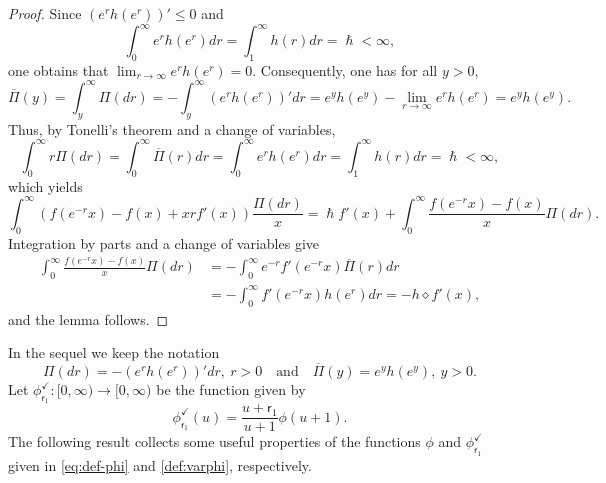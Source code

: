 \documentclass[10pt]{amsart}
\theoremstyle{plain}
\theoremstyle{definition}
\newcommand{\vat}{{\mathsf{r}_1}}
\renewcommand{\varphi}{{\phi_{\vat}^{\checkmark}}}
\let\h\hslash
\begin{document}
\begin{proof}
Since $(e^rh(e^r))' \le 0$ and
\begin{equation*}
\int_0^\infty e^rh(e^r)dr = \int_1^\infty h(r)dr = \h < \infty,
\end{equation*}
one obtains that $\lim_{r \to \infty} e^r h(e^r) = 0$. Consequently, one has for all $y>0$,
\begin{equation*}
\overline{\Pi}(y) = \int_y^\infty \Pi(dr) = -\int_y^\infty (e^rh(e^r))' dr = e^yh(e^y) - \lim_{r \to \infty} e^r h(e^r) = e^yh(e^y).
\end{equation*}
Thus, by Tonelli's theorem and a change of variables,
\begin{equation*}
\int_0^\infty r\Pi(dr) = \int_0^\infty \overline{\Pi}(r)dr = \int_0^{\infty} e^r h(e^r) dr = \int_1^\infty h(r)dr = \h < \infty,
\end{equation*}
which yields
\begin{equation*}
\int_{0}^{\infty} \left(f(e^{-r}x)-f(x)+xrf'(x)\right)\frac{\Pi(dr)}{x} = \h f'(x) + \int_0^\infty \frac{f(e^{-r}x)-f(x)}{x} \Pi(dr).
\end{equation*}
Integration by parts and a change of variables give
\begin{align*}
\int_0^\infty \frac{f(e^{-r}x)-f(x)}{x} \Pi(dr) &= -\int_0^\infty e^{-r} f'(e^{-r}x) \overline{\Pi}(r)dr\\
&= -\int_0^\infty f'(e^{-r}x)h(e^r)dr = -h \diamond f'(x),
\end{align*}
and the lemma follows.
\end{proof}

In the sequel we keep the notation
\[
\Pi(dr) = -(e^rh(e^r))'dr,\ r > 0\quad\text{and}\quad \overline{\Pi}(y) = e^y h(e^y),\ y > 0.
\]
Let $\varphi: [0,\infty) \to [0,\infty)$ be the function given by
\begin{equation}
\label{def:varphi}
\varphi(u) = \frac{u+\vat}{u+1}\phi(u+1).
\end{equation}
The following result collects some useful properties of the functions $\phi$ and $\varphi$
given in \eqref{eq:def-phi} and \eqref{def:varphi}, respectively.
\end{document}
